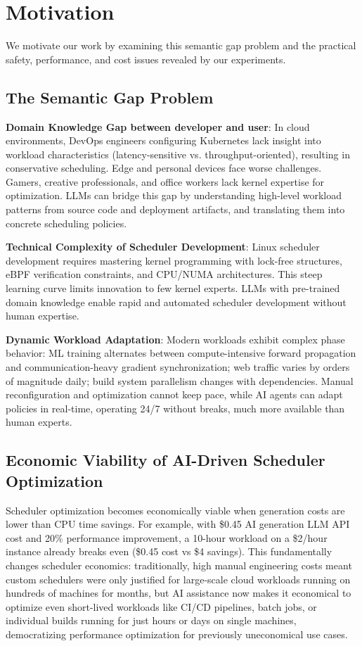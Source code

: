 \section{Motivation}
\label{sec:motivation}

We motivate our work by examining this semantic gap problem and the practical safety, performance, and cost issues revealed by our experiments.

\subsection{The Semantic Gap Problem}

\textbf{Domain Knowledge Gap between developer and user}: In cloud environments, DevOps engineers configuring Kubernetes lack insight into workload characteristics (latency-sensitive vs. throughput-oriented), resulting in conservative scheduling. Edge and personal devices face worse challenges. Gamers, creative professionals, and office workers lack kernel expertise for optimization. LLMs can bridge this gap by understanding high-level workload patterns from source code and deployment artifacts, and translating them into concrete scheduling policies.

\textbf{Technical Complexity of Scheduler Development}: Linux scheduler development requires mastering kernel programming with lock-free structures, eBPF verification constraints, and CPU/NUMA architectures. This steep learning curve limits innovation to few kernel experts. LLMs with pre-trained domain knowledge enable rapid and automated scheduler development without human expertise.

\textbf{Dynamic Workload Adaptation}: Modern workloads exhibit complex phase behavior: ML training alternates between compute-intensive forward propagation and communication-heavy gradient synchronization; web traffic varies by orders of magnitude daily; build system parallelism changes with dependencies. Manual reconfiguration and optimization cannot keep pace, while AI agents can adapt policies in real-time, operating 24/7 without breaks, much more available than human experts.

\subsection{Economic Viability of AI-Driven Scheduler Optimization}

Scheduler optimization becomes economically viable when generation costs are lower than CPU time savings. For example, with \$0.45 AI generation LLM API cost and 20\% performance improvement, a 10-hour workload on a \$2/hour instance already breaks even (\$0.45 cost vs \$4 savings). This fundamentally changes scheduler economics: traditionally, high manual engineering costs meant custom schedulers were only justified for large-scale cloud workloads running on hundreds of machines for months, but AI assistance now makes it economical to optimize even short-lived workloads like CI/CD pipelines, batch jobs, or individual builds running for just hours or days on single machines, democratizing performance optimization for previously uneconomical use cases.

